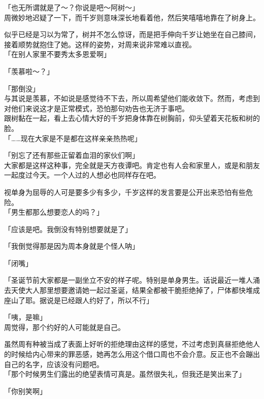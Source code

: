 「也无所谓就是了～？你说是吧～阿树～」\\

周微妙地迟疑了一下，而千岁则意味深长地看着他，然后笑嘻嘻地靠在了树身上。

似乎已经是习以为常了，树并不怎么惊讶，而是把手伸向千岁让她坐在自己膝间，接着顺势就抱住了她。这样的姿势，对周来说非常难以直视。\\

「在别人家里不要秀太多恩爱啊」

「羡慕啦～？」

「那倒没」\\

与其说是羡慕，不如说是感觉待不下去，所以周希望他们能收敛下。然而，考虑到对他们来说这才是正常模式，恐怕那句劝告也无济于事吧。\\

跟树黏在一起，看上去心情大好的千岁把身体靠在树胸前，仰头望着天花板和树的脸。\\

「……现在大家是不是都在这样亲亲热热呢」

「别忘了还有那些正留着血泪的家伙们啊」\\

大家都是这样这种事，完全就是天方夜谭吧。肯定也有人会和家里人，或是和朋友一起度过今天。一个人过的人想必也同样存在吧。

视单身为屈辱的人可是要多少有多少，千岁这样的发言要是公开出来恐怕有些危险。\\

「男生都那么想要恋人的吗？」

「应该是吧。我倒没有特别想要就是了」

「我倒觉得那是因为周本身就是个怪人呐」

「闭嘴」

「圣诞节前大家都是一副坐立不安的样子呢。特别是单身男生。话说最近一堆人涌去天使大人那里想要邀请她一起过圣诞，结果全都被干脆拒绝掉了，尸体都快堆成座山了耶。据说是已经跟人约好了，所以不行」

「咦，是嘛」\\

周觉得，那个约好的人可能就是自己。

虽然周有种被当成了表面上好听的拒绝理由这样的感觉，不过考虑到真昼拒绝他人的时候给内心带来的罪恶感，她再怎么用这个借口周也不会介意。反正也不会蹦出自己的名字，应该没有问题吧。\\

「那个时候男生们露出的绝望表情可真是。虽然很失礼，但我还是笑出来了」

「你别笑啊」

